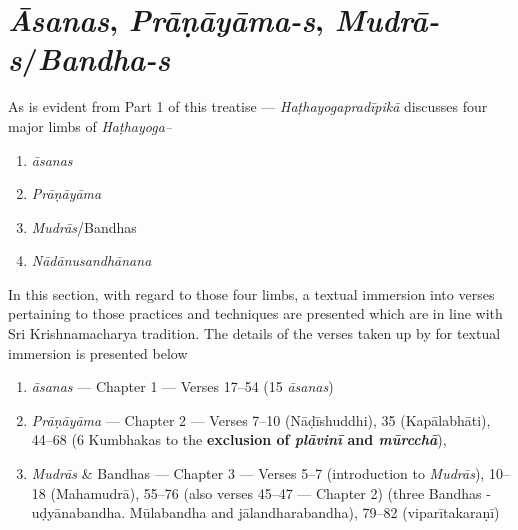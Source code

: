 \part{\textit{Āsanas}, \textit{Prāṇāyāma-s}, \textit{Mudrā-s}/\textit{Bandha-s}}


As is evident from Part 1 of this treatise --- \textit{Haṭhayogapradīpikā} discusses four major limbs of \textit{Haṭhayoga–} 
\begin{enumerate}
\itemsep=0pt
\renewcommand{\theenumi}{\alph{enumi}}
\renewcommand{\labelenumi}{\theenumi)}
\item \textit{āsanas} 
\item \textit{Prāṇāyāma} 
\item \textit{Mudrās}/Bandhas 
\item \textit{Nādānusandhānana}
\end{enumerate}

In this section, with regard to those four limbs, a textual immersion into verses pertaining to those practices and techniques are presented which are in line with Sri Krishnamacharya tradition. The details of the verses taken up by for textual immersion is presented below

\begin{enumerate}
\itemsep=0pt
\item \textit{āsanas} --- Chapter 1 --- Verses 17--54 (15 \textit{āsanas})
\item \textit{Prāṇāyāma} --- Chapter 2 ---  Verses 7--10 (Nāḍīshuddhi), 35 (Kapālabhāti), 44--68 (6 Kumbhakas to the \textbf{exclusion of \textit{plāvinī} and \textit{mūrcchā}}), 
\item \textit{Mudrās} \& Bandhas --- Chapter 3 --- Verses 5--7 (introduction to \textit{Mudrās}), 10--18 (Mahamudrā), 55--76 (also verses 45--47 --- Chapter 2) (three Bandhas - uḍyānabandha. Mūlabandha and jālandharabandha), 79--82 (viparītakaraṇī)
\end{enumerate}


